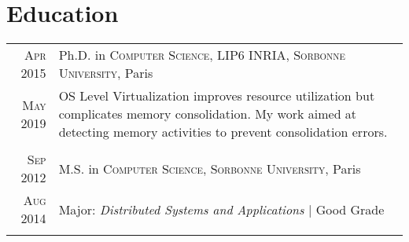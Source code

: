 \documentclass[a4paper,10pt]{article} %
\begin{document}

\section{Education}

\begin{tabular}{r|p{11cm}}


\textsc{Apr 2015} & Ph.D. in \textsc{Computer Science}, \textsc{LIP6 INRIA, Sorbonne University}, Paris\\
\textsc{May 2019} & \footnotesize{
OS Level Virtualization improves resource utilization but complicates memory consolidation.
My work aimed at detecting memory activities to prevent consolidation errors.
}\\

\multicolumn{2}{c}{} \\


\textsc{Sep 2012} & M.S. in \textsc{Computer Science}, \textsc{Sorbonne University}, Paris\\ %
\textsc{Aug 2014} & Major: \emph{Distributed Systems and Applications} | Good Grade\\
\multicolumn{2}{c}{} \\




\end{tabular}
\end{document}
